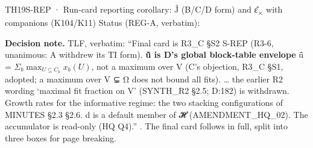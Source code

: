 \begin{card}{TH19}{S-REP · Run-card reporting corollary: Ĵ (B/C/D form) and ε̂\textsubscript{×} with companions (K104/K11)}
\approvedFB\quad Status (REG-A, verbatim):  

\textbf{Decision note.} TLF, verbatim: ``Final card is R3\_C §S2 S-REP (R3-6, unanimous: A withdrew its TI form). \textbf{ū̂ is D's global block-table envelope} ū̂ = $Σ_b \max_{U⊆C_b} x_b(U)$, not a maximum over V (C's objection, R3\_C §S1, adopted; a maximum over V ⊊ Ω does not bound all fits). \ldots{} the earlier R2 wording `maximal fit fraction on V' (SYNTH\_R2 §2.5; D:182) is withdrawn. Growth rates for the informative regime: the two stacking configurations of MINUTES §2.3 §2.6. d is a default member of 𝓗 (AMENDMENT\_HQ\_02). The accumulator is read-only (HQ Q4).''  . The final card follows in full, split into three boxes for page breaking.


\end{card}
